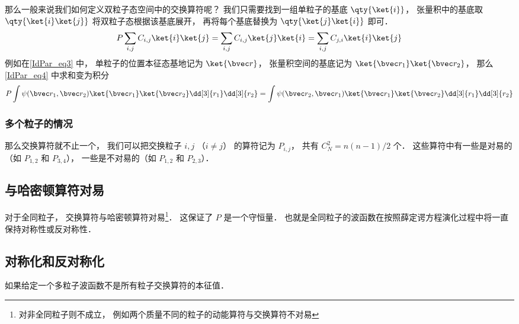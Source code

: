 那么一般来说我们如何定义双粒子态空间中的交换算符呢？ 我们只需要找到一组单粒子的基底 $\qty{\ket{i}}$， 张量积中的基底取 $\qty{\ket{i}\ket{j}}$ 将双粒子态根据该基底展开， 再将每个基底替换为 $\qty{\ket{j}\ket{i}}$ 即可．
\begin{equation}\label{IdPar_eq4}
P \sum_{i,j} C_{i,j} \ket{i}\ket{j} = \sum_{i,j} C_{i,j} \ket{j}\ket{i} = \sum_{i,j} C_{j,i} \ket{i}\ket{j}
\end{equation}
例如在\autoref{IdPar_eq3} 中， 单粒子的位置本征态基地记为 $\ket{\bvec r}$， 张量积空间的基底记为 $\ket{\bvec r_1}\ket{\bvec r_2}$， 那么\autoref{IdPar_eq4} 中求和变为积分
\begin{equation}
P \int \psi(\bvec r_1, \bvec r_2) \ket{\bvec r_1}\ket{\bvec r_2} \dd[3]{r_1} \dd[3]{r_2} = \int \psi(\bvec r_2, \bvec r_1) \ket{\bvec r_1}\ket{\bvec r_2} \dd[3]{r_1} \dd[3]{r_2}
\end{equation}

\subsubsection{多个粒子的情况}
那么交换算符就不止一个， 我们可以把交换粒子 $i,j$ （$i\ne j$） 的算符记为 $P_{i,j}$， 共有 $C_N^2 = n(n-1)/2$ 个． 这些算符中有一些是对易的（如 $P_{1,2}$ 和 $P_{3,4}$）， 一些是不对易的（如 $P_{1,2}$ 和 $P_{2,3}$）． 

\subsection{与哈密顿算符对易}

对于全同粒子， 交换算符与哈密顿算符对易\footnote{对非全同粒子则不成立， 例如两个质量不同的粒子的动能算符与交换算符不对易}． 这保证了 $P$ 是一个守恒量． 也就是全同粒子的波函数在按照薛定谔方程演化过程中将一直保持对称性或反对称性．

\subsection{对称化和反对称化}
如果给定一个多粒子波函数不是所有粒子交换算符的本征值．



